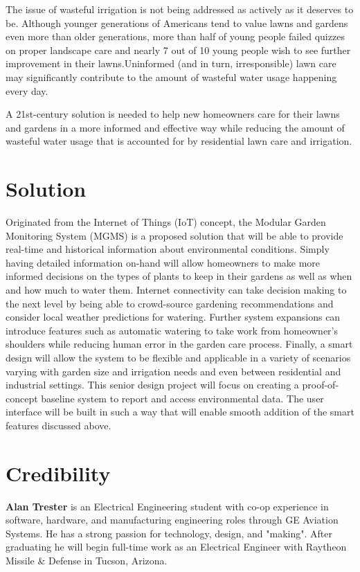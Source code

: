 \documentclass{report}
\begin{document}
The issue of wasteful irrigation is not being addressed as actively as it deserves to be. Although  younger  generations  of  Americans  tend  to  value  lawns  and  gardens  even  more than older generations, more than half of young people failed quizzes on proper landscape care and nearly 7 out of 10 young people wish to see further improvement in their lawns\cite{epa_drought_nodate}.Uninformed (and in turn, irresponsible) lawn care may significantly contribute to the amount of wasteful water usage happening every day.

A 21st-century solution is needed to help new homeowners care for their lawns and gardens in a more informed and effective way while reducing the amount of wasteful water usage that is accounted for by residential lawn care and irrigation. \\

\section{Solution}

Originated from the Internet of Things (IoT) concept, the Modular Garden Monitoring System (MGMS) is a proposed solution that will be able to provide real-time and historical information about environmental conditions. Simply having detailed information on-hand will allow homeowners to make more informed decisions on the types of plants to keep in their gardens as well as when and how much to water them. Internet connectivity can take decision making to the next level by being able to crowd-source gardening recommendations and consider local weather predictions for watering. Further system expansions can introduce features such as automatic watering to take work from homeowner's shoulders while reducing human error in the garden care process. Finally, a smart design will allow the system to be flexible and applicable in a variety of scenarios varying with garden size and irrigation needs and even between residential and industrial settings. This senior design project will focus on creating a proof-of-concept baseline system to report and access environmental data. The user interface will be built in such a way that will enable smooth addition of the smart features discussed above.

\newpage
\section{Credibility}

\textbf{Alan Trester} is an Electrical Engineering student with co-op experience in software, hardware, and manufacturing engineering roles through GE Aviation Systems. He has a strong passion for technology, design, and "making". After graduating he will begin full-time work as an Electrical Engineer with Raytheon Missile \& Defense in Tucson, Arizona.\\
\end{document}
